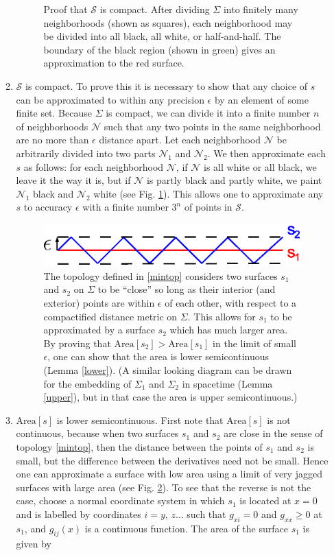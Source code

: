 \documentclass[12pt]{article}
\begin{document}
\begin{enumerate}[resume]
\begin{enumerate}
\begin{figure}[hbt]
\caption{\footnotesize Proof that $\mathcal{S}$ is compact.  After dividing $\Sigma$ into finitely many neighborhoods (shown as squares), each neighborhood may be divided into all black, all white, or half-and-half.  The boundary of the black region (shown in green) gives an approximation to the red surface.
}\label{approx}
\end{figure}
	\item $\mathcal{S}$ is compact.  To prove this it is necessary to show that any choice of $s$ can be approximated to within any precision $\epsilon$ by an element of some finite set.  Because $\Sigma$ is compact, we can divide it into a finite number $n$ of neighborhoods $\mathcal{N}$ such that any two points in the same neighborhood are no more than $\epsilon$ distance apart.  Let each neighborhood $\mathcal{N}$ be arbitrarily divided into two parts $\mathcal{N}_1$ and $\mathcal{N}_2$.  We then approximate each $s$ as follows: for each neighborhood $\mathcal{N}$, if $\mathcal{N}$ is all white or all black, we leave it the way it is, but if $\mathcal{N}$ is partly black and partly white, we paint $\mathcal{N}_1$ black and $\mathcal{N}_2$ white (see Fig. \ref{approx}).  This allows one to approximate any $s$ to accuracy $\epsilon$ with a finite number $3^n$ of points in $\mathcal{S}$.
\begin{figure}[hbt]
\centering
\includegraphics[width=.6\textwidth]{jags.eps}
\caption{\footnotesize The topology defined in \ref{mintop} considers two surfaces $s_1$ and $s_2$ on $\Sigma$ to be ``close'' so long as their interior (and exterior) points are within $\epsilon$ of each other, with respect to a compactified distance metric on $\Sigma$.  This allows for $s_1$ to be approximated by a surface $s_2$ which has much larger area.  By proving that $\mathrm{Area}[s_2] > \mathrm{Area}[s_1]$ in the limit of small $\epsilon$, one can show that the area is lower semicontinuous (Lemma \ref{lower}).  (A similar looking diagram can be drawn for the embedding of $\Sigma_1$ and $\Sigma_2$ in spacetime (Lemma \ref{upper}), but in that case the area is upper semicontinuous.)
}\label{jags}
\end{figure}
	\item \label{lower} $\mathrm{Area}[s]$ is lower semicontinuous.  First note that $\mathrm{Area}[s]$ is not continuous, because when two surfaces $s_1$ and $s_2$ are close in the sense of topology \ref{mintop}, then the distance between the points of $s_1$ and $s_2$ is small, but the difference between the derivatives need not be small.  Hence one can approximate a surface with low area using a limit of very jagged surfaces with large area (see Fig. \ref{jags}).  To see that the reverse is not the case, choose a normal coordinate system in which $s_1$ is located at $x = 0$ and is labelled by coordinates $i = y,\,z\ldots$ such that $g_{xi} = 0$ and $g_{xx} \ge 0$ at $s_1$, and $g_{ij}(x)$ is a continuous function.  The area of the surface $s_1$ is given by

\end{enumerate}
\end{enumerate}
\end{document}
